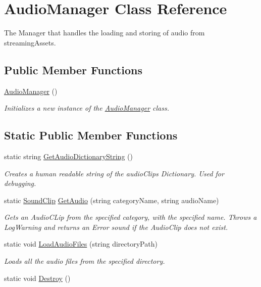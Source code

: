 \hypertarget{class_audio_manager}{}\section{Audio\+Manager Class Reference}
\label{class_audio_manager}


The Manager that handles the loading and storing of audio from streaming\+Assets.  


\subsection*{Public Member Functions}
\begin{DoxyCompactItemize}
\item 
\hyperlink{class_audio_manager_a3b15a1c66b05db34662afc48280e46cd}{Audio\+Manager} ()
\begin{DoxyCompactList}\small\item\em Initializes a new instance of the \hyperlink{class_audio_manager}{Audio\+Manager} class. \end{DoxyCompactList}\end{DoxyCompactItemize}
\subsection*{Static Public Member Functions}
\begin{DoxyCompactItemize}
\item 
static string \hyperlink{class_audio_manager_a6299d7d95089dc7f96f3596905496b6a}{Get\+Audio\+Dictionary\+String} ()
\begin{DoxyCompactList}\small\item\em Creates a human readable string of the audio\+Clips Dictionary. Used for debugging. \end{DoxyCompactList}\item 
static \hyperlink{class_sound_clip}{Sound\+Clip} \hyperlink{class_audio_manager_a58e26f36e8bf3c4f06312bcc9ec75f13}{Get\+Audio} (string category\+Name, string audio\+Name)
\begin{DoxyCompactList}\small\item\em Gets an Audio\+C\+Lip from the specified category, with the specified name. Throws a Log\+Warning and returns an Error sound if the Audio\+Clip does not exist. \end{DoxyCompactList}\item 
static void \hyperlink{class_audio_manager_a5f2cf46ece0d2721215fc43865ddc378}{Load\+Audio\+Files} (string directory\+Path)
\begin{DoxyCompactList}\small\item\em Loads all the audio files from the specified directory. \end{DoxyCompactList}\item 
static void \hyperlink{class_audio_manager_ae00b97e57d52aa4b569004c48e5cd9ab}{Destroy} ()
\end{DoxyCompactItemize}
